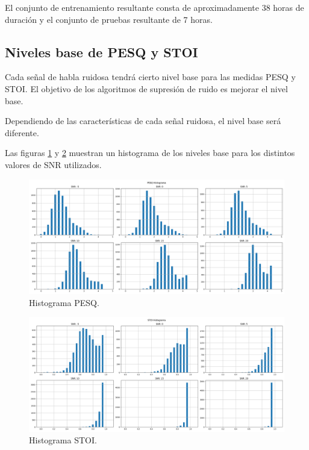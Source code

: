 El conjunto de entrenamiento resultante consta de aproximadamente 38 horas de duración y el conjunto de pruebas resultante de 7 horas.


\subsection{Niveles base de PESQ y STOI}

Cada señal de habla ruidosa tendrá cierto nivel base para las medidas PESQ y STOI. El objetivo de los algoritmos de supresión de ruido es mejorar el nivel base.

Dependiendo de las características de cada señal ruidosa, el nivel base será diferente.

Las figuras \ref{fig:ch5_pesq_histogram} y \ref{fig:ch5_stoi_histogram} muestran un histograma de los niveles base para los distintos valores de SNR utilizados.

\begin{figure}[H]
	\centering
	\centerline{\includegraphics[scale=0.35]{images/ch5/pesq_aggregated.png}}
	\caption{Histograma PESQ.}
	\label{fig:ch5_pesq_histogram}
\end{figure}

\begin{figure}[H]
	\centering
	\centerline{\includegraphics[scale=0.35]{images/ch5/stoi_aggregated.png}}
	\caption{Histograma STOI.}
	\label{fig:ch5_stoi_histogram}
\end{figure}

